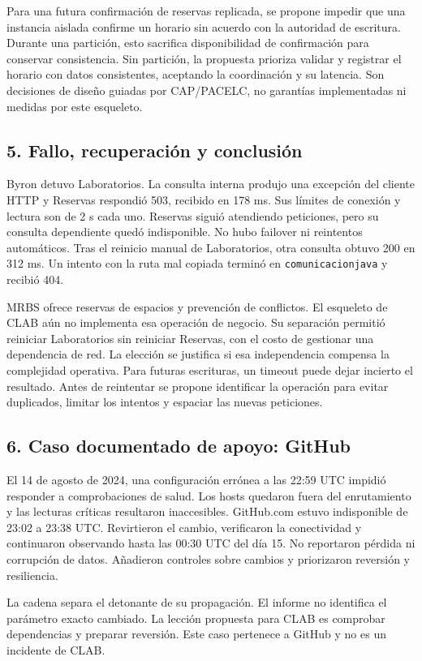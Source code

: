 Para una futura confirmación de reservas replicada, se propone impedir que una instancia aislada confirme un horario sin acuerdo con la autoridad de escritura. Durante una partición, esto sacrifica disponibilidad de confirmación para conservar consistencia. Sin partición, la propuesta prioriza validar y registrar el horario con datos consistentes, aceptando la coordinación y su latencia. Son decisiones de diseño guiadas por CAP/PACELC, no garantías implementadas ni medidas por este esqueleto.

\subsection*{5. Fallo, recuperación y conclusión}
Byron detuvo Laboratorios. La consulta interna produjo una excepción del cliente HTTP y Reservas respondió 503, recibido en 178 ms. Sus límites de conexión y lectura son de 2 s cada uno. Reservas siguió atendiendo peticiones, pero su consulta dependiente quedó indisponible. No hubo failover ni reintentos automáticos. Tras el reinicio manual de Laboratorios, otra consulta obtuvo 200 en 312 ms. Un intento con la ruta mal copiada terminó en \texttt{comunicacionjava} y recibió 404.

MRBS ofrece reservas de espacios y prevención de conflictos. El esqueleto de CLAB aún no implementa esa operación de negocio. Su separación permitió reiniciar Laboratorios sin reiniciar Reservas, con el costo de gestionar una dependencia de red. La elección se justifica si esa independencia compensa la complejidad operativa. Para futuras escrituras, un timeout puede dejar incierto el resultado. Antes de reintentar se propone identificar la operación para evitar duplicados, limitar los intentos y espaciar las nuevas peticiones.

\subsection*{6. Caso documentado de apoyo: GitHub}
El 14 de agosto de 2024, una configuración errónea a las 22:59 UTC impidió responder a comprobaciones de salud. Los hosts quedaron fuera del enrutamiento y las lecturas críticas resultaron inaccesibles. GitHub.com estuvo indisponible de 23:02 a 23:38 UTC. Revirtieron el cambio, verificaron la conectividad y continuaron observando hasta las 00:30 UTC del día 15. No reportaron pérdida ni corrupción de datos. Añadieron controles sobre cambios y priorizaron reversión y resiliencia.

La cadena separa el detonante de su propagación. El informe no identifica el parámetro exacto cambiado. La lección propuesta para CLAB es comprobar dependencias y preparar reversión. Este caso pertenece a GitHub y no es un incidente de CLAB.

